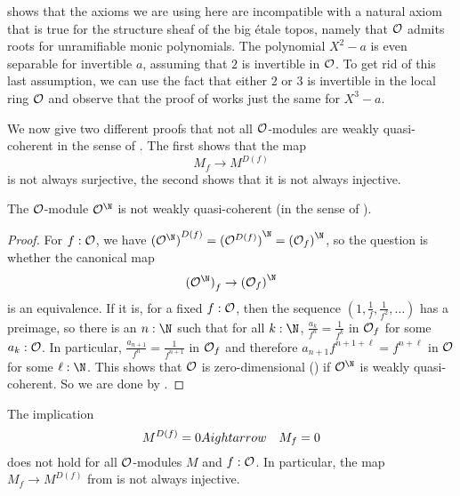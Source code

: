 \begin{remark}
   shows that
  the axioms we are using here
  are incompatible with a natural axiom that is true
  for the structure sheaf of the big étale topos,
  namely that $\mathcal O$ admits roots for unramifiable monic polynomials.
  The polynomial $X^2 - a$ is even separable for invertible $a$,
  assuming that $2$ is invertible in $\mathcal O$.
  To get rid of this last assumption,
  we can use the fact that either $2$ or $3$ is invertible in the local ring $\mathcal O$
  and observe that the proof of 
  works just the same for $X^3 - a$.
\end{remark}

We now give two different proofs that not all $\mathcal O$-modules are weakly quasi-coherent
in the sense of .
The first shows that the map
\[ M_f \to M^{D(f)} \]
is not always surjective,
the second shows that it is not always injective.

\begin{proposition}%
  \label{RN-non-wqc}
  The $\mathcal O$-module $\A^\N$ is not weakly quasi-coherent
  (in the sense of ).
\end{proposition}

\begin{proof}
  For $f : \mathcal O$,
  we have ${(\A^{\N})}^{D(f)} = {(\A^{D(f)})}^\N = {(\A_f)}^\N$,
  so the question is whether the canonical map
  \[ {(\A^\N)}_f \to {(\A_f)}^\N \]
  is an equivalence.
  If it is,
  for a fixed $f : \mathcal O$,
  then the sequence $(1, \frac{1}{f}, \frac{1}{f^2}, \dots)$
  has a preimage,
  so there is an $n : \N$ such that
  for all $k : \N$,
  $\frac{a_k}{f^n} = \frac{1}{f^k}$ in $\mathcal O_f$
  for some $a_k : \mathcal O$.
  In particular, $\frac{a_{n+1}}{f^n} = \frac{1}{f^{n+1}}$ in $\mathcal O_f$
  and therefore $a_{n+1} f^{n+1+\ell} = f^{n+\ell}$ in $\mathcal O$ for some $\ell : \N$.
  This shows that $\mathcal O$ is zero-dimensional
  ()
  if $\A^\N$ is weakly quasi-coherent.
  So we are done by .
\end{proof}

\begin{proposition}%
  \label{non-wqc-module-family}
  The implication
  \[ M^{D(f)} = 0 \quad\\Aightarrow\quad M_f = 0 \]
  does not hold for all $\mathcal O$-modules $M$ and $f : \mathcal O$.
  In particular,
  the map $M_f \to M^{D(f)}$ from 
  is not always injective.
\end{proposition}

